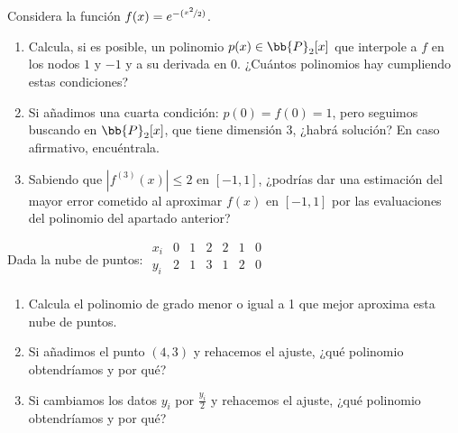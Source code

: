 \documentclass[12pt]{article}
\begin{document}
	\begin{ejercicio}[2 puntos]
		Considera la función $f(x) = e^{-(\nicefrac{x^2}{2})}$. 
		\begin{enumerate}[label=\alph*)]
			\item Calcula, si es posible, un polinomio $p(x) \in \bb{P}_2[x]$ que interpole a $f$ en los nodos $1$ y $-1$ y a su derivada en $0$. ¿Cuántos polinomios hay cumpliendo estas condiciones?
			
			\item Si añadimos una cuarta condición: $p(0) = f(0) = 1$, pero seguimos buscando en $\bb{P}_2[x]$, que tiene dimensión 3, ¿habrá solución? En caso afirmativo, encuéntrala.
			
			\item Sabiendo que $|f^{(3)}(x)| \leq 2$ en $[-1, 1]$, ¿podrías dar una estimación del mayor error cometido al aproximar $f(x)$ en $[-1, 1]$ por las evaluaciones del polinomio del apartado anterior?
			
		\end{enumerate}
	\end{ejercicio}
	
	\begin{ejercicio}[2 puntos]
		Dada la nube de puntos: 
		$\begin{array}{c|c|c|c|c|c|c}
			x_i & 0 & 1 & 2 & 2 & 1 & 0 \\
			\hline
			y_i & 2 & 1 & 3 & 1 & 2 & 0 \\
		\end{array}$
		
		\begin{enumerate}[label=\alph*)]
			\item Calcula el polinomio de grado menor o igual a 1 que mejor aproxima esta nube de puntos.
			
			\item Si añadimos el punto $(4, 3)$ y rehacemos el ajuste, ¿qué polinomio obtendríamos y por qué?
			
			\item Si cambiamos los datos $y_i$ por $\displaystyle \frac{y_i}{2}$ y rehacemos el ajuste, ¿qué polinomio obtendríamos y por qué?
			
		\end{enumerate}
	\end{ejercicio}
	
\end{document}

